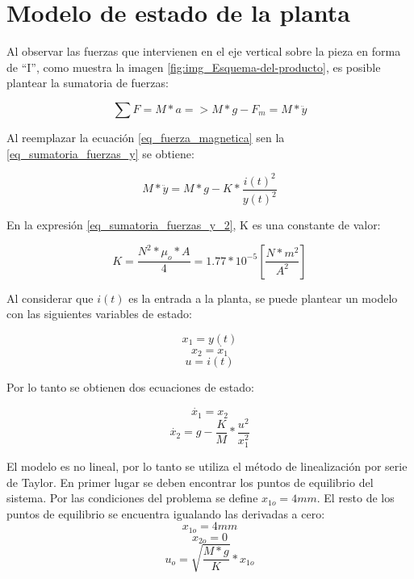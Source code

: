 \section{Modelo de estado de la planta}

\noindent Al observar las fuerzas que intervienen en el eje vertical sobre la pieza en forma de ``I'', como muestra la imagen \ref{fig:img_Esquema-del-producto}, es posible plantear la sumatoria de fuerzas:

\begin{equation}\label{eq_sumatoria_fuerzas_y}
	\sum F=M*a=>M*g-F_{m}=M*\ddot{y}
\end{equation}

\noindent Al reemplazar la ecuación \ref{eq_fuerza_magnetica} sen la \ref{eq_sumatoria_fuerzas_y} se obtiene:

\begin{equation}\label{eq_sumatoria_fuerzas_y_2}
	M*\ddot{y}=M*g-K*\frac{i(t)^{2}}{y(t)^{2}}
\end{equation}

\noindent En la expresión \ref{eq_sumatoria_fuerzas_y_2}, K es una constante de valor:

\begin{equation}
	K=\frac{N^{2}*\mu_{o}*A}{4}=1.77*10^{-5} [\frac{N*m^2}{A^2}]
\end{equation}

\noindent Al considerar que $i(t)$ es la entrada a la planta, se puede plantear un modelo con las siguientes variables de estado:\newline

\begin{equation}
	x_{1}=y(t)
\end{equation}
\begin{equation}
	x_{2}=\dot{x_{1}}
\end{equation}
\begin{equation}
	u=i(t)
\end{equation}

\noindent Por lo tanto se obtienen dos ecuaciones de estado:

\begin{equation}
	\dot{x_{1}}=x_{2}
\end{equation}
\begin{equation}
	\dot{x_{2}}=g-\frac{K}{M}*\frac{u^{2}}{x_{1}^{2}}
\end{equation}

\noindent El modelo es no lineal, por lo tanto se utiliza el método de linealización por serie de Taylor. En primer lugar se deben encontrar los puntos de equilibrio del sistema. Por las condiciones del problema se define $x_{1o}=4mm$. El resto de los puntos de equilibrio se encuentra igualando las derivadas a cero:
\begin{equation}
	x_{1o}=4mm
\end{equation}
\begin{equation}
	x_{2o}=0
\end{equation}
\begin{equation}
	u_{o}=\sqrt{\frac{M*g}{K}}*x_{1o}
\end{equation}

